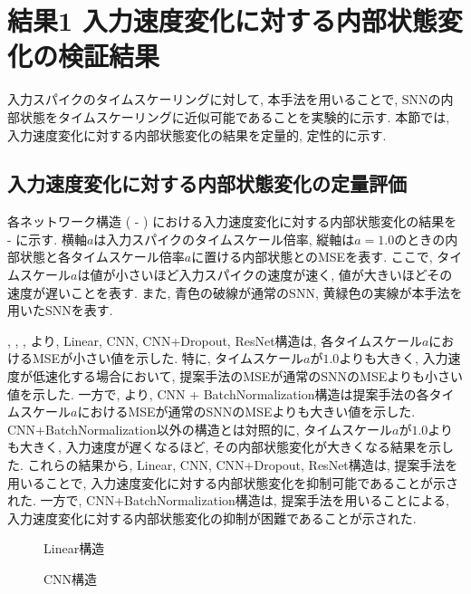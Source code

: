 \section{結果1 入力速度変化に対する内部状態変化の検証結果} \label{sec:result1}
入力スパイクのタイムスケーリングに対して, 本手法を用いることで, SNNの内部状態をタイムスケーリングに近似可能であることを実験的に示す.
本節では, 入力速度変化に対する内部状態変化の結果を定量的, 定性的に示す.

\subsection{入力速度変化に対する内部状態変化の定量評価}
各ネットワーク構造 ( - ) における入力速度変化に対する内部状態変化の結果を -  に示す.
横軸$a$は入力スパイクのタイムスケール倍率, 縦軸は$a=1.0$のときの内部状態と各タイムスケール倍率$a$に置ける内部状態とのMSEを表す.
ここで, タイムスケール$a$は値が小さいほど入力スパイクの速度が速く, 値が大きいほどその速度が遅いことを表す.
また, 青色の破線が通常のSNN, 黄緑色の実線が本手法を用いたSNNを表す.

, , , より, Linear, CNN, CNN+Dropout, ResNet構造は, 各タイムスケール$a$におけるMSEが小さい値を示した.
特に, タイムスケール$a$が$1.0$よりも大きく, 入力速度が低速化する場合において, 提案手法のMSEが通常のSNNのMSEよりも小さい値を示した.
一方で, より, CNN + BatchNormalization構造は提案手法の各タイムスケール$a$におけるMSEが通常のSNNのMSEよりも大きい値を示した.
CNN+BatchNormalization以外の構造とは対照的に, タイムスケール$a$が$1.0$よりも大きく, 入力速度が遅くなるほど, その内部状態変化が大きくなる結果を示した.
これらの結果から, Linear, CNN, CNN+Dropout, ResNet構造は, 提案手法を用いることで, 入力速度変化に対する内部状態変化を抑制可能であることが示された.
一方で, CNN+BatchNormalization構造は, 提案手法を用いることによる, 入力速度変化に対する内部状態変化の抑制が困難であることが示された.

\begin{figure}[htb]
    \centering
    
    \caption{Linear構造}
    \label{fig:result1:1:linear}
\end{figure}

\begin{figure}[htb]
    \centering
    
    \caption{CNN構造}
    \label{fig:result1:1:cnn}
\end{figure}

